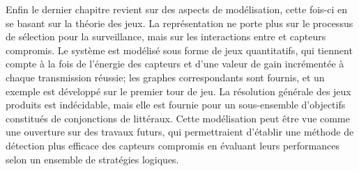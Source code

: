 Enfin le dernier chapitre revient sur des aspects de modélisation, cette fois-ci en se basant sur la théorie des jeux.
La représentation ne porte plus sur le processus de sélection pour la surveillance, mais sur les interactions entre \cnst et capteurs compromis.
Le système est modélisé sous forme de jeux quantitatifs, qui tiennent compte à la fois de l'énergie des capteurs et d'une valeur de gain incrémentée à chaque transmission réussie; les graphes correspondants sont fournis, et un exemple est développé sur le premier tour de jeu.
La résolution générale des jeux produits est indécidable, mais elle est fournie pour un sous-ensemble d'objectifs constitués de conjonctions de littéraux.
Cette modélisation peut être vue comme une ouverture sur des travaux futurs, qui permettraient d'établir une méthode de détection plus efficace des capteurs compromis en évaluant leurs performances selon un ensemble de stratégies logiques.

